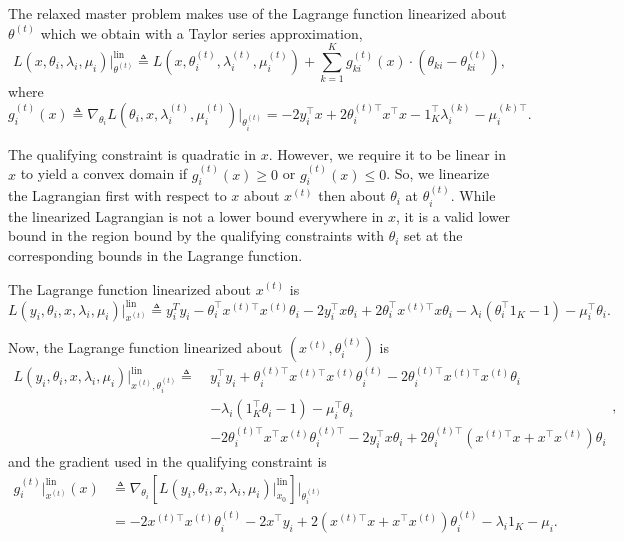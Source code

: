 \documentclass[11pt]{article}
\newcommand{\T}{\ensuremath{\top}}
\renewcommand{\leq}{\leqslant}
\renewcommand{\geq}{\geqslant}
\begin{document}
The relaxed master problem makes use of the Lagrange function linearized about $\theta^{(t)}$ which we obtain with a Taylor series approximation,
\begin{equation}
    L(x, \theta_i, \lambda_i, \mu_i) \big\vert_{\theta^{(t)}}^{\text{lin}} \triangleq L(x, \theta_i^{(t)}, \lambda_i^{(t)}, \mu_i^{(t)}) + \sum_{k=1}^K g_{ki}^{(t)}(x) \cdot \left(\theta_{ki} - \theta_{ki}^{(t)} \right),
\end{equation}
where 
\begin{equation}\label{eqn:qc1}
g^{(t)}_{i}(x) \triangleq \nabla_{\theta_i} L \left(\theta_i, x, \lambda_i^{(t)}, \mu_i^{(t)} \right) \big\vert_{\theta_i^{(t)}} = -2 y_i^\T x + 2 \theta^{(t)\T}_i x^\T x - 1_K^\T \lambda_i^{(k)} - \mu_i^{(k)\T}.
\end{equation}

The qualifying constraint is quadratic in $x$. However, we require it to be linear in $x$ to yield a convex domain if $g^{(t)}_{i}(x) \geq 0$ or $g^{(t)}_{i}(x) \leq 0$. 
So, we linearize the Lagrangian first with respect to $x$ about $x^{(t)}$ then about $\theta_i$ at $\theta_i^{(t)}$. 
While the linearized Lagrangian is not a lower bound everywhere in $x$, it is a valid lower bound in the region bound by the qualifying constraints with $\theta_i$ set at the corresponding bounds in the Lagrange function.

The Lagrange function linearized about $x^{(t)}$ is
\begin{equation}
L(y_i, \theta_i, x, \lambda_i, \mu_i) \bigg\vert^{\text{lin}}_{x^{(t)}} \triangleq 
y_i^T y_i - \theta_i^\T x^{(t)\T} x^{(t)} \theta_i - 2 y_i^\T x \theta_i + 2 \theta_i^\T x^{(t)\T} x \theta_i - \lambda_i(\theta_i^\T 1_K - 1) - \mu_i^\T \theta_i.
\end{equation}

Now, the Lagrange function linearized about $(x^{(t)}, \theta_i^{(t)})$ is
%
\begin{equation}
\begin{split}
L(y_i, \theta_i, x, \lambda_i, \mu_i) \bigg|^{\text{lin}}_{x^{(t)}, \theta_i^{(t)}} \triangleq\ & y_i^\T y_i + \theta_i^{(t)\T} x^{(t)\T} x^{(t)} \theta_i^{(t)} -2 \theta_i^{(t)\T} x^{(t)\T} x^{(t)} \theta_i \\
& - \lambda_i(1_K^\T \theta_i - 1) - \mu_i^\T \theta_i \\
& - 2 \theta_i^{(t)\T} x^\T x^{(t)} \theta_i^{(t)\T} - 2 y_i^\T x \theta_i + 2 \theta_i^{(t)\T} (x^{(t)\T} x + x^\T x^{(t)}) \theta_i
\end{split},
\end{equation}
%
and the gradient used in the qualifying constraint is
%
\begin{equation}
	\begin{split}
		g^{(t)}_i\big\vert^{\text{lin}}_{x^{(t)}}(x) &\triangleq \nabla_{\theta_i} \left[ L(y_i, \theta_i, x, \lambda_i, \mu_i) \bigg|^{\text{lin}}_{x_0} \right] \bigg|_{\theta_i^{(t)}} \\
		& = -2 x^{(t)\T} x^{(t)} \theta_i^{(t)} -2 x^\T y_i + 2 (x^{(t)\T} x + x^\T x^{(t)}) \theta_i^{(t)} - \lambda_i 1_K - \mu_i.
\end{split}
\end{equation}
\end{document}

